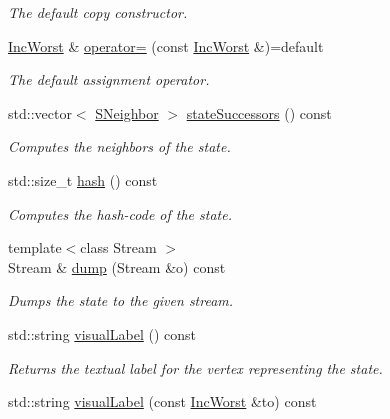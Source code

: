 \begin{DoxyCompactItemize}
\begin{DoxyCompactList}\small\item\em The default copy constructor. \end{DoxyCompactList}\item 
\hyperlink{structdomain_1_1incWorst_1_1IncWorst}{Inc\+Worst} \& \hyperlink{structdomain_1_1incWorst_1_1IncWorst_a4fe60a41c48a49861c0cc4a71a172b81}{operator=} (const \hyperlink{structdomain_1_1incWorst_1_1IncWorst}{Inc\+Worst} \&)=default
\begin{DoxyCompactList}\small\item\em The default assignment operator. \end{DoxyCompactList}\item 
std\+::vector$<$ \hyperlink{structdomain_1_1incWorst_1_1IncWorst_ad8493d75afb1ff651ab6c20cb20541fa}{S\+Neighbor} $>$ \hyperlink{structdomain_1_1incWorst_1_1IncWorst_a168a8537a49ee920855273ed93ef0fc2}{state\+Successors} () const 
\begin{DoxyCompactList}\small\item\em Computes the neighbors of the state. \end{DoxyCompactList}\item 
std\+::size\+\_\+t \hyperlink{structdomain_1_1incWorst_1_1IncWorst_abb107685df70f4422149f8736ae8981d}{hash} () const 
\begin{DoxyCompactList}\small\item\em Computes the hash-\/code of the state. \end{DoxyCompactList}\item 
{\footnotesize template$<$class Stream $>$ }\\Stream \& \hyperlink{structdomain_1_1incWorst_1_1IncWorst_aea8ff4e12b89ddfded9bbe42d4809cf3}{dump} (Stream \&o) const 
\begin{DoxyCompactList}\small\item\em Dumps the state to the given stream. \end{DoxyCompactList}\item 
std\+::string \hyperlink{structdomain_1_1incWorst_1_1IncWorst_a12f854ece6b96b2ebc45f26dbf1a7d5b}{visual\+Label} () const 
\begin{DoxyCompactList}\small\item\em Returns the textual label for the vertex representing the state. \end{DoxyCompactList}\item 
std\+::string \hyperlink{structdomain_1_1incWorst_1_1IncWorst_aa7a1a73642d47043fd26be46df09bf7a}{visual\+Label} (const \hyperlink{structdomain_1_1incWorst_1_1IncWorst}{Inc\+Worst} \&to) const 

\end{DoxyCompactItemize}
